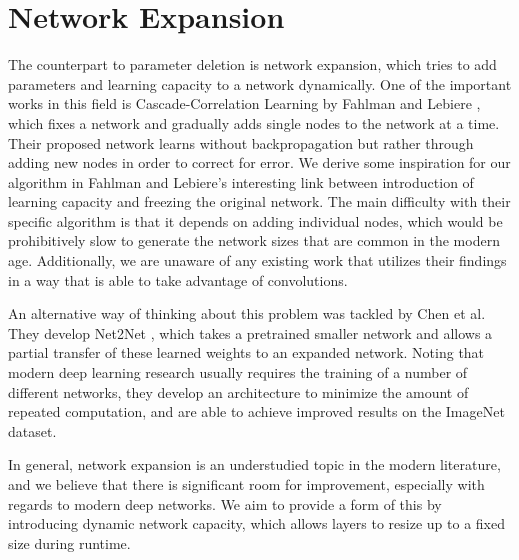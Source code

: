 \section{Network Expansion}
The counterpart to parameter deletion is network expansion, which tries to add parameters and learning capacity to a network dynamically.
One of the important works in this field is Cascade-Correlation Learning by Fahlman and Lebiere \cite{fahlman1990cascade}, which fixes a network and gradually adds single nodes to the network at a time.
Their proposed network learns without backpropagation but rather through adding new nodes in order to correct for error.
We derive some inspiration for our algorithm in Fahlman and Lebiere's interesting link between introduction of learning capacity and freezing the original network.
The main difficulty with their specific algorithm is that it depends on adding individual nodes, which would be prohibitively slow to generate the network sizes that are common in the modern age.
Additionally, we are unaware of any existing work that utilizes their findings in a way that is able to take advantage of convolutions.

An alternative way of thinking about this problem was tackled by Chen et al. They develop Net2Net \cite{chen2015net2net}, which takes a pretrained smaller network and allows a partial transfer of these learned weights to an expanded network.
Noting that modern deep learning research usually requires the training of a number of different networks, they develop an architecture to minimize the amount of repeated computation, and are able to achieve improved results on the ImageNet dataset.

In general, network expansion is an understudied topic in the modern literature, and we believe that there is significant room for improvement, especially with regards to modern deep networks.
We aim to provide a form of this by introducing dynamic network capacity, which allows layers to resize up to a fixed size during runtime.
